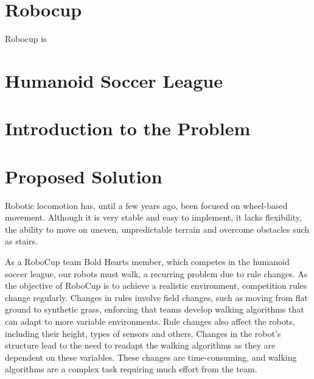 \section{Robocup}
Robocup is 
\cite{robocup}
\section{Humanoid Soccer League}

\section{Introduction to the Problem}


\section{Proposed Solution}





Robotic locomotion has, until a few years ago, been focused on wheel-based movement. 
Although it is very stable and easy to implement, it lacks flexibility, the ability to move on uneven, unpredictable terrain and overcome obstacles such as stairs.

As a RoboCup team Bold Hearts member, which competes in the humanoid soccer league, our robots must walk, a recurring problem due to rule changes. 
As the objective of RoboCup is to achieve a realistic environment, competition rules change regularly. 
Changes in rules involve field changes, such as moving from flat ground to synthetic grass, enforcing that teams develop walking algorithms that can adapt to more variable environments. 
Rule changes also affect the robots, including their height, types of sensors and others. 
Changes in the robot's structure lead to the need to readapt the walking algorithms as they are dependent on these variables. 
These changes are time-consuming, and walking algorithms are a complex task requiring much effort from the team.